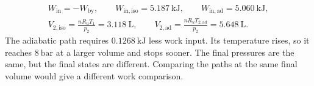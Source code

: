 \begin{gather*}
W_{\mathrm{in}}=-W_{\mathrm{by}},\qquad
\boxed{W_{\mathrm{in,iso}}=5.187~\mathrm{kJ}},\qquad
\boxed{W_{\mathrm{in,ad}}=5.060~\mathrm{kJ}},\\
V_{2,\mathrm{iso}}=\frac{nR_uT_1}{p_2}=3.118~\mathrm{L},\qquad
V_{2,\mathrm{ad}}=\frac{nR_uT_{2,\mathrm{ad}}}{p_2}=5.648~\mathrm{L}.
\end{gather*}
The adiabatic path requires $0.1268~\mathrm{kJ}$ less work
input. Its temperature rises, so it reaches $8~\mathrm{bar}$ at a larger
volume and stops sooner. The final pressures are the same, but the final states are different. Comparing the paths at the same final volume would give a different work comparison.
